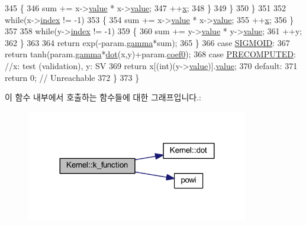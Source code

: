 \begin{DoxyCode}
345                     \{
346                         sum += x->\hyperlink{structsvm__node_a9ca47b8a156238d04213453f3b89e177}{value} * x->\hyperlink{structsvm__node_a9ca47b8a156238d04213453f3b89e177}{value};
347                         ++\hyperlink{class_kernel_a725a35660c4309605c2628fa8290ce5f}{x};
348                     \}
349                 \}
350             \}
351 
352             \textcolor{keywordflow}{while}(x->\hyperlink{structsvm__node_aa733ca75ee5a5c0f36af5ddb4c6394d9}{index} != -1)
353             \{
354                 sum += x->\hyperlink{structsvm__node_a9ca47b8a156238d04213453f3b89e177}{value} * x->\hyperlink{structsvm__node_a9ca47b8a156238d04213453f3b89e177}{value};
355                 ++\hyperlink{class_kernel_a725a35660c4309605c2628fa8290ce5f}{x};
356             \}
357 
358             \textcolor{keywordflow}{while}(y->\hyperlink{structsvm__node_aa733ca75ee5a5c0f36af5ddb4c6394d9}{index} != -1)
359             \{
360                 sum += y->\hyperlink{structsvm__node_a9ca47b8a156238d04213453f3b89e177}{value} * y->\hyperlink{structsvm__node_a9ca47b8a156238d04213453f3b89e177}{value};
361                 ++y;
362             \}
363             
364             \textcolor{keywordflow}{return} exp(-param.\hyperlink{structsvm__parameter_a91667b90506e171482b5fc619377110d}{gamma}*sum);
365         \}
366         \textcolor{keywordflow}{case} \hyperlink{svm_8h_adf764cbdea00d65edcd07bb9953ad2b7a11c1096689b7d3504dbcc4f61d854883}{SIGMOID}:
367             \textcolor{keywordflow}{return} tanh(param.\hyperlink{structsvm__parameter_a91667b90506e171482b5fc619377110d}{gamma}*\hyperlink{class_kernel_af258ecfb8ca0182e6a79c06291586e5b}{dot}(x,y)+param.\hyperlink{structsvm__parameter_a3ab3555a96a578bea6e5285a5db0a4db}{coef0});
368         \textcolor{keywordflow}{case} \hyperlink{svm_8h_adf764cbdea00d65edcd07bb9953ad2b7a27a6ccce9f5a44692a040b08a6923285}{PRECOMPUTED}:  \textcolor{comment}{//x: test (validation), y: SV}
369             \textcolor{keywordflow}{return} x[(int)(y->\hyperlink{structsvm__node_a9ca47b8a156238d04213453f3b89e177}{value})].\hyperlink{structsvm__node_a9ca47b8a156238d04213453f3b89e177}{value};
370         \textcolor{keywordflow}{default}:
371             \textcolor{keywordflow}{return} 0;  \textcolor{comment}{// Unreachable }
372     \}
373 \}
\end{DoxyCode}


이 함수 내부에서 호출하는 함수들에 대한 그래프입니다.\+:
\nopagebreak
\begin{figure}[H]
\begin{center}
\leavevmode
\includegraphics[width=275pt]{class_kernel_a6ff0d4ac64bf7fba29d2ca3433dd5127_cgraph}
\end{center}
\end{figure}




